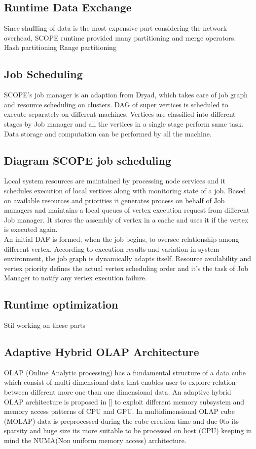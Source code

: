 \documentclass[runningheads,a4paper]{llncs}
\begin{document}
\subsection*{Runtime Data Exchange}
Since shuffling of data is the most expensive part considering the network overhead, SCOPE runtime provided many partitioning and merge operators.
Hash partitioning
Range partitioning

\subsection*{Job Scheduling}
SCOPE's job manager is an adaption from Dryad, which takes care of job graph and resource scheduling on clusters. DAG of super vertices is scheduled to execute separately on different machines. Vertices are classified into different stages by Job manager and all the vertices in a single stage perform same task.  Data storage and computation can be performed by all the machine.\\
\subsection*{Diagram SCOPE job scheduling}
Local system resources are maintained by processing node services and it schedules execution of local vertices along with monitoring state of a job. Based on available resources and priorities it generates process on behalf of Job managers and maintains a local queues of vertex execution request from different Job manager. It stores the assembly of vertex in a cache and uses it if the vertex is executed again.\\

An initial DAF is formed, when the job begins, to oversee relationship among different vertex. According to execution results and variation in system environment, the job graph is dynamically adapts itself. Resource availability and vertex priority defines the actual vertex scheduling order and it's the task of Job Manager to notify any vertex execution failure.

\subsection*{Runtime optimization}

Stil working on these parts

\subsection*{Adaptive Hybrid OLAP Architecture}
OLAP (Online Analytic processing) has a fundamental structure of a data cube which consist of multi-dimensional data that enables user to explore relation between different more one than one dimensional data. An adaptive hybrid OLAP architecture is proposed in [] to exploit different memory subsystem and memory access patterns of CPU and GPU.  In multidimensional OLAP cube (MOLAP) data is preprocessed during the cube creation time and due 0to its sparsity and huge size its more suitable to be processed on host (CPU) keeping in mind the NUMA(Non uniform memory access) architecture.\\
\end{document}
